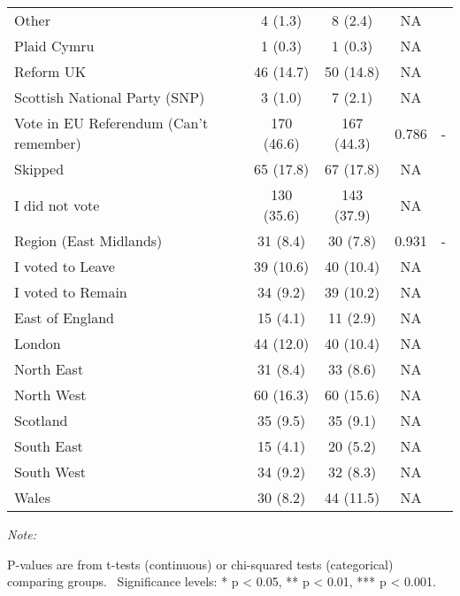 \begin{table}
\begin{threeparttable}
\begin{tabular}[t]{lcccc}
Other & 4 (1.3) & 8 (2.4) & NA & \\
Plaid Cymru & 1 (0.3) & 1 (0.3) & NA & \\
\addlinespace
Reform UK & 46 (14.7) & 50 (14.8) & NA & \\
Scottish National Party (SNP) & 3 (1.0) & 7 (2.1) & NA & \\
Vote in EU Referendum (Can’t remember) & 170 (46.6) & 167 (44.3) & 0.786 & -\\
Skipped & 65 (17.8) & 67 (17.8) & NA & \\
I did not vote & 130 (35.6) & 143 (37.9) & NA & \\
\addlinespace
Region (East Midlands) & 31 (8.4) & 30 (7.8) & 0.931 & -\\
I voted to Leave & 39 (10.6) & 40 (10.4) & NA & \\
I voted to Remain & 34 (9.2) & 39 (10.2) & NA & \\
East of England & 15 (4.1) & 11 (2.9) & NA & \\
London & 44 (12.0) & 40 (10.4) & NA & \\
\addlinespace
North East & 31 (8.4) & 33 (8.6) & NA & \\
North West & 60 (16.3) & 60 (15.6) & NA & \\
Scotland & 35 (9.5) & 35 (9.1) & NA & \\
South East & 15 (4.1) & 20 (5.2) & NA & \\
South West & 34 (9.2) & 32 (8.3) & NA & \\
\addlinespace
Wales & 30 (8.2) & 44 (11.5) & NA & \\
\bottomrule
\end{tabular}
\begin{tablenotes}
\item \textit{Note: } 
\item P-values are from t-tests (continuous) or chi-squared tests (categorical) comparing groups. \ Significance levels: * p < 0.05, ** p < 0.01, *** p < 0.001.
\end{tablenotes}
\end{threeparttable}
\end{table}
